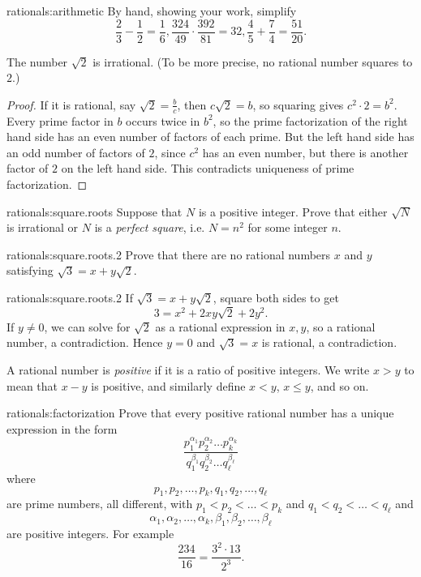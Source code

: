 \begin{answer}{rationals:arithmetic}
By hand, showing your work, simplify
\[
\frac{2}{3}-\frac{1}{2}=\frac{1}{6}, \frac{324}{49} \cdot \frac{392}{81}=32,
\frac{4}{5}+\frac{7}{4}=\frac{51}{20}.
\]
\end{answer}
\begin{lemma}
The number \(\sqrt{2}\) is irrational.
(To be more precise, no rational number squares to \(2\).)
\end{lemma}
\begin{proof}
If it is rational, say \(\sqrt{2}=\frac{b}{c}\), then \(c \sqrt{2}=b\), so squaring gives \(c^2 \cdot 2 = b^2\).
Every prime factor in \(b\) occurs twice in \(b^2\), so the prime factorization of the right hand side has an even number of factors of each prime.
But the left hand side has an odd number of factors of \(2\), since \(c^2\) has an even number, but there is another factor of \(2\) on the left hand side.
This contradicts uniqueness of prime factorization.
\end{proof}
\begin{problem}{rationals:square.roots}
Suppose that \(N\) is a positive integer.
Prove that either \(\sqrt{N}\) is irrational or \(N\) is a \emph{perfect square}, i.e. \(N=n^2\) for some integer \(n\).
\end{problem}
\begin{problem}{rationals:square.roots.2}
Prove that there are no rational numbers \(x\) and \(y\) satisfying \(\sqrt{3}=x+y\sqrt{2}\).
\end{problem}
\begin{answer}{rationals:square.roots.2}
If \(\sqrt{3}=x+y\sqrt{2}\), square both sides to get
\[
3 = x^2+2xy\sqrt{2}+2y^2.
\]
If \(y\ne 0\), we can solve for \(\sqrt{2}\) as a rational expression in \(x,y\), so a rational number, a contradiction.
Hence \(y=0\) and \(\sqrt{3}=x\) is rational, a contradiction.
\end{answer}
A rational number is \emph{positive} if it is a ratio of positive integers.
We write \(x > y\) to mean that \(x-y\) is positive, and similarly define \(x<y\), \(x\le y\), and so on.
\begin{problem}{rationals:factorization}
Prove that every positive rational number has a unique expression in the form
\[
\frac{p_1^{\alpha_1} p_2^{\alpha_2} \dots p_k^{\alpha_k}}%
{q_1^{\beta_1} q_2^{\beta_2} \dots q_{\ell}^{\beta_{\ell}}}
\]
where
\[
p_1, p_2, \dots, p_k, q_1, q_2, \dots, q_{\ell}
\] 
are prime numbers, all different, with \(p_1 < p_2 < \dots < p_k\) and \(q_1 < q_2 < \dots < q_{\ell}\) and
\[
\alpha_1, \alpha_2, \dots, \alpha_k,
\beta_1, \beta_2, \dots, \beta_{\ell}
\]
are positive integers.
For example
\[
\frac{234}{16}=\frac{3^2 \cdot 13}{2^3}.
\]
\end{problem}
